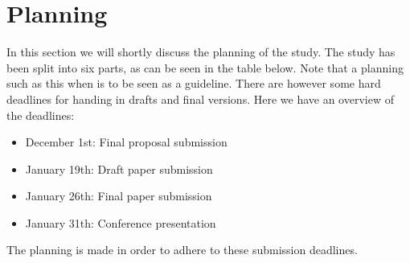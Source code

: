 \section{Planning}
 In this section we will shortly discuss the planning of the study. The study has been split into six parts, as can be seen in the table below. Note that a planning such as this when is to be seen as a guideline. There are however some hard deadlines for handing in drafts and final versions. Here we have an overview of the deadlines:
 \begin{itemize}	
	\item December 1st: Final proposal submission
	\item January 19th: Draft paper submission
	\item January 26th: Final paper submission
	\item January 31th: Conference presentation
\end{itemize}
The planning is made in order to adhere to these submission deadlines.


\begin{figure}[ht]
		\noindent{}
\end{figure}



